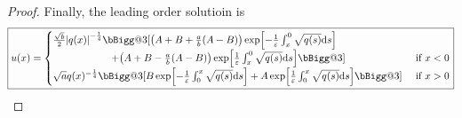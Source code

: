 \documentclass{article} %
\makeatletter
\theoremstyle{plain}
\newcommand{\BIGG}{\bBigg@{3}}
\newcommand{\E}{\varepsilon}
\numberwithin{equation}{section} %
\numberwithin{figure}{section} %
\numberwithin{table}{section} %
\makeatother
\begin{document}
\begin{proof}
    Finally, the leading order solutioin is
    \begin{align*}
        \boxed{u(x) = \begin{cases}
            \frac{\sqrt{b}}{2}\abs{q(x)}^{-\frac{1}{4}}\BIGG[\qty(A + B + \frac{a}{b}(A - B))\exp[-\frac{1}{\E}\int_x^0\sqrt{q(s)}\dd s] \\
            \qquad \qquad \ \ \ \ \ \hspace{1px} + \qty(A + B - \frac{a}{b}\qty(A - B))\exp[\frac{1}{\E}\int_x^0\sqrt{q(s)}\dd s]\BIGG] & \text{ if } x < 0 \\
            \sqrt{a}q(x)^{-\frac{1}{4}}\BIGG[B\exp[-\frac{1}{\E}\int_0^x\sqrt{q(s)}\dd s] + A\exp[\frac{1}{\E}\int_0^x\sqrt{q(s)}\dd s]\BIGG] & \text{ if } x > 0
        \end{cases}}
    \end{align*}
\end{proof}
\end{document}
